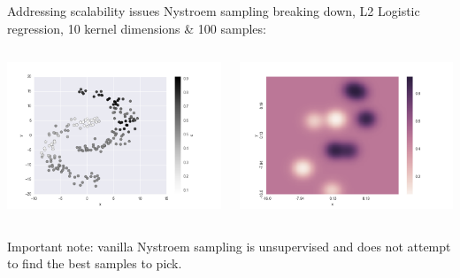 \documentclass[11pt]{beamer}
\begin{document}
\begin{frame}{Addressing scalability issues}
Nystroem sampling breaking down, L2 Logistic regression, 10 kernel dimensions \& 100 samples:
\begin{columns}
\includegraphics[scale=0.3]{arcs_nystroem_low.png} 

\includegraphics[scale=0.3]{arcs_nystroem_hm_low.png} 
\end{columns}
Important note: vanilla Nystroem sampling is unsupervised and does not attempt to find the best samples to pick.
\end{frame}
\end{document}
